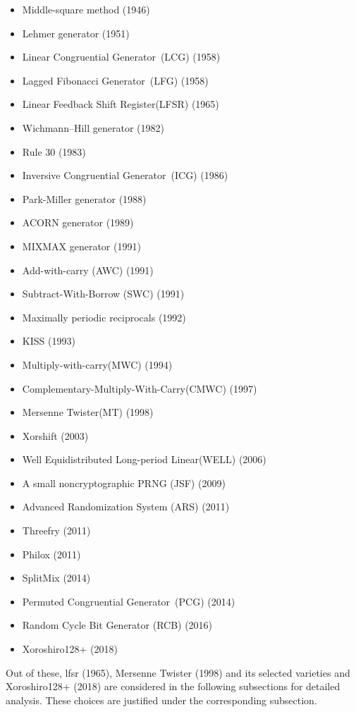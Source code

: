 \begin{itemize}
    \item Middle-square method (1946)
	\item Lehmer generator (1951)
	\item Linear Congruential Generator (LCG) (1958)
	\item Lagged Fibonacci Generator (LFG) (1958)
	\item Linear Feedback Shift Register(LFSR) (1965)
	\item Wichmann–Hill generator (1982)
	\item Rule 30 (1983)
	\item Inversive Congruential Generator (ICG) (1986)
	\item Park-Miller generator (1988)
	\item ACORN generator (1989)
	\item MIXMAX generator (1991)
	\item Add-with-carry (AWC) (1991)
	\item Subtract-With-Borrow (SWC) (1991)
	\item Maximally periodic reciprocals (1992)
	\item KISS (1993)
	\item Multiply-with-carry(MWC) (1994)
	\item Complementary-Multiply-With-Carry(CMWC) (1997)
	\item Mersenne Twister(MT) (1998)
	\item Xorshift (2003)
	\item Well Equidistributed Long-period Linear(WELL) (2006)
	\item A small noncryptographic PRNG (JSF) (2009)
	\item Advanced Randomization System (ARS) (2011)
	\item Threefry (2011)
	\item Philox (2011)
	\item SplitMix (2014)
	\item Permuted Congruential Generator (PCG) (2014)
	\item Random Cycle Bit Generator (RCB) (2016)
	\item Xoroshiro128+ (2018)
\end{itemize}

Out of these, \acrfull{lfsr} (1965), Mersenne Twister (1998) and its selected varieties and Xoroshiro128+ (2018) are considered in the following subsections for detailed analysis. These choices are justified under the corresponding subsection.

